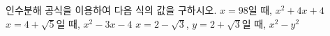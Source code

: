 인수분해 공식을 이용하여 다음 식의 값을 구하시오.
 $x=98$일 때, $x^2+4x+4$
 $x=4+\sqrt{5}$일 때, $x^2-3x-4$
 $x=2-\sqrt{3}$, $y=2+\sqrt{3}$일 때, $x^2-y^2$
